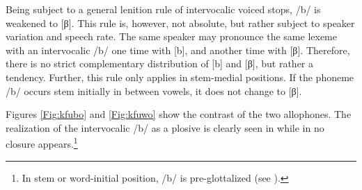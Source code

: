 




 Being subject to a general lenition rule of intervocalic voiced stops, /b/ is weakened to [β]. This rule is, however, not absolute, but rather subject to speaker variation and speech rate. The same speaker may pronounce the same lexeme with an intervocalic /b/ one time with [b], and another time with [β]. Therefore, there is no strict complementary distribution of [b] and [β], but rather a tendency. Further, this rule only applies in stem-medial positions. If the phoneme /b/ occurs stem initially in between vowels, it does not change to [β].

\newpage
Figures \ref{Fig:kfubo} and \ref{Fig:kfuwo} show the contrast of the two allophones. The realization of the intervocalic /b/ as a plosive is clearly seen in  while in  no closure appears.\footnote{In stem or word-initial position, /b/ is pre-glottalized (see ).}



